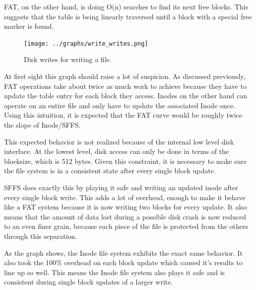 \documentclass[10pt,twocolumn]{article}
\begin{document}
  FAT, on the other hand, is doing O(n) searches to find its next free blocks. 
  This suggests that the table is being linearly traversed until a block with a 
  special free marker is found.

  \begin{figure}[h]
    \begin{center}
      \texttt{[image: ../graphs/write\_writes.png]}
      \label{fig:delete_seeks}
      \caption{Disk writes for writing a file.}
    \end{center}
  \end{figure}

  At first sight this graph should raise a lot of suspicion. As discussed
  previously, FAT operations take about twice as much work to achieve because 
  they have to update the table entry for each block they access. Inodes on the 
  other hand can operate on an entire file and only have to update the 
  associated Inode once. Using this intuition, it is expected that the FAT 
  curve would be roughly twice the slope of Inode/SFFS.

  This expected behavior is not realized because of the internal low level disk
  interface. At the lowest level, disk access can only be done in terms of
  the blocksize, which is 512 bytes. Given this constraint, it is necessary
  to make sure the file system is in a consistent state after every single
  block update.

  SFFS does exactly this by playing it safe and writing an updated inode after 
  every single block write. This adds a lot of overhead, enough to make it 
  behave like a FAT system because it is now writing two blocks for every 
  update. It also means that the amount of data lost during a possible disk
  crash is now reduced to an even finer grain, because each piece of the file
  is protected from the others through this separation.

  As the graph shows, the Inode file system exhibits the exact same behavior.
  It also took the 100\% overhead on each block update which caused it's 
  results to line up so well. This means the Inode file system also plays it
  safe and is consistent during single block updates of a larger write.
\end{document}
